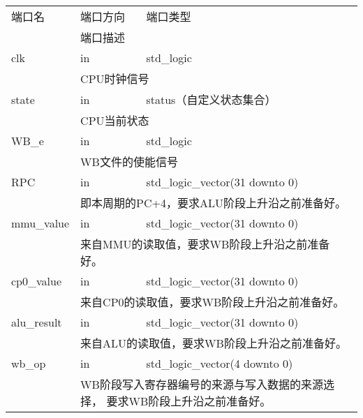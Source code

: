         \begin{tabularx}{\textwidth}{lll}
            \toprule
            端口名          & 端口方向  & 端口类型 \\
            \cmidrule(l){2-3}
            &
            \multicolumn{2}{X}{端口描述} \\
            \midrule
            clk             & in        & std\_logic \\
            \cmidrule(l){2-3}
            &
            \multicolumn{2}{X}{
                CPU时钟信号
            } \\
            \midrule
            state           & in        & status（自定义状态集合） \\
            \cmidrule(l){2-3}
            &
            \multicolumn{2}{X}{
                CPU当前状态
            } \\
            \midrule
            WB\_e           & in        & std\_logic \\
            \cmidrule(l){2-3}
            &
            \multicolumn{2}{X}{
                WB文件的使能信号
            } \\
            \midrule
            RPC             & in        & std\_logic\_vector(31 downto 0) \\
            \cmidrule(l){2-3}
            &
            \multicolumn{2}{X}{
                即本周期的PC+4，要求ALU阶段上升沿之前准备好。
            } \\
            \midrule
            mmu\_value      & in        & std\_logic\_vector(31 downto 0) \\
            \cmidrule(l){2-3}
            &
            \multicolumn{2}{X}{
                来自MMU的读取值，要求WB阶段上升沿之前准备好。
            } \\
            \midrule
            cp0\_value      & in        & std\_logic\_vector(31 downto 0) \\
            \cmidrule(l){2-3}
            &
            \multicolumn{2}{X}{
                来自CP0的读取值，要求WB阶段上升沿之前准备好。
            } \\
            \midrule
            alu\_result     & in        & std\_logic\_vector(31 downto 0) \\
            \cmidrule(l){2-3}
            &
            \multicolumn{2}{X}{
                来自ALU的读取值，要求WB阶段上升沿之前准备好。
            } \\
            \midrule
            wb\_op          & in        & std\_logic\_vector(4 downto 0) \\
            \cmidrule(l){2-3}
            &
            \multicolumn{2}{X}{
                WB阶段写入寄存器编号的来源与写入数据的来源选择，%
                要求WB阶段上升沿之前准备好。

}
\end{tabularx}

